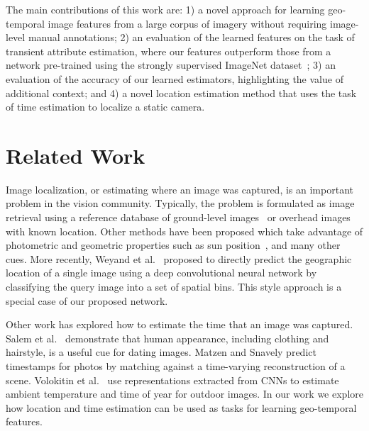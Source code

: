 \documentclass{bmvc2k}
\begin{document}
The main contributions of this work are: 1) a novel approach for
learning geo-temporal image features from a large corpus of imagery
without requiring image-level manual annotations; 2) an evaluation of
the learned features on the task of transient attribute estimation,
where our features outperform those from a network pre-trained using
the strongly supervised ImageNet dataset~\cite{ILSVRC15}; 3) an
evaluation of the accuracy of our learned estimators, highlighting the
value of additional context; and 4) a novel location estimation method
that uses the task of time estimation to localize a static camera. 

\section{Related Work}

Image localization, or estimating where an image was captured, is an
important problem in the vision community. Typically, the problem is
formulated as image retrieval using a reference database of
ground-level images~\cite{im2gps} or overhead
images~\cite{lin2015learning,workman2015geocnn,workman2015localize}
with known location.  Other methods have been proposed which take
advantage of photometric and geometric properties such as sun
position~\cite{lalonde2010sun,workman2014rainbow}, and many other
cues. More recently, Weyand et al.~\cite{planet} proposed to directly
predict the geographic location of a single image using a deep
convolutional neural network by classifying the query image into a set
of spatial bins. This style approach is a special case of our proposed
network.

Other work has explored how to estimate the time that an image was
captured. Salem et al.~\cite{salem2016dating} demonstrate that human
appearance, including clothing and hairstyle, is a useful cue for
dating images. Matzen and Snavely predict timestamps for photos by
matching against a time-varying reconstruction of a scene.  Volokitin
et al.~\cite{eth_biwi_01292} use representations extracted from CNNs
to estimate ambient temperature and time of year for outdoor images.
In our work we explore how location and time estimation can be used
as tasks for learning geo-temporal features. 
\end{document}
